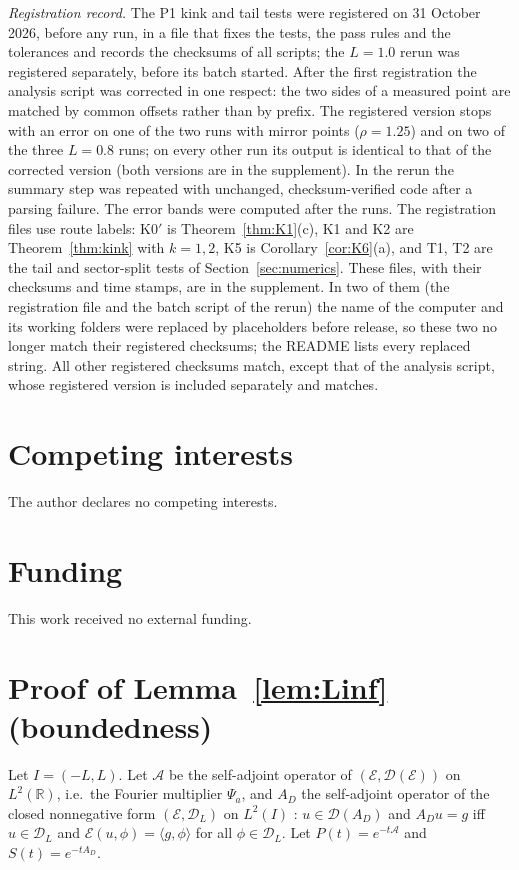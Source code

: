 \documentclass[11pt]{amsart}
\newcommand{\R}{\mathbb{R}}
\newcommand{\cE}{\mathcal{E}}
\theoremstyle{definition}
\theoremstyle{remark}
\numberwithin{equation}{section}
\begin{document}
\emph{Registration record.} The P1 kink and tail tests were registered on 31 October 2026, before any run, in a file that fixes the tests, the pass rules and the tolerances and records the checksums of all scripts; the $L=1.0$ rerun was registered separately, before its batch started. After the first registration the analysis script was corrected in one respect: the two sides of a measured point are matched by common offsets rather than by prefix. The registered version stops with an error on one of the two runs with mirror points ($\rho=1.25$) and on two of the three $L=0.8$ runs; on every other run its output is identical to that of the corrected version (both versions are in the supplement). In the rerun the summary step was repeated with unchanged, checksum-verified code after a parsing failure. The error bands were computed after the runs. The registration files use route labels: K0$'$ is Theorem~\ref{thm:K1}(c), K1 and K2 are Theorem~\ref{thm:kink} with $k=1,2$, K5 is Corollary~\ref{cor:K6}(a), and T1, T2 are the tail and sector-split tests of Section~\ref{sec:numerics}. These files, with their checksums and time stamps, are in the supplement. In two of them (the registration file and the batch script of the rerun) the name of the computer and its working folders were replaced by placeholders before release, so these two no longer match their registered checksums; the README lists every replaced string. All other registered checksums match, except that of the analysis script, whose registered version is included separately and matches.

\section*{Competing interests}
The author declares no competing interests.

\section*{Funding}
This work received no external funding.

\appendix
\section{Proof of Lemma~\ref{lem:Linf} (boundedness)}\label{app:Linf}

Let $I=(-L,L)$. Let $\mathcal A$ be the self-adjoint operator of $(\cE,\mathcal D(\cE))$ on $L^2(\R)$, i.e.\ the Fourier multiplier $\Psi_a$, and $A_D$ the self-adjoint operator of the closed nonnegative form $(\cE,\mathcal D_L)$ on $L^2(I)$ \cite[Thm.~VI.2.1]{Kato95}: $u\in \mathcal D(A_D)$ and $A_Du=g$ iff $u\in \mathcal D_L$ and $\cE(u,\phi)=\langle g,\phi\rangle$ for all $\phi\in \mathcal D_L$. Let $P(t)=e^{-t\mathcal A}$ and $S(t)=e^{-tA_D}$.
\end{document}
